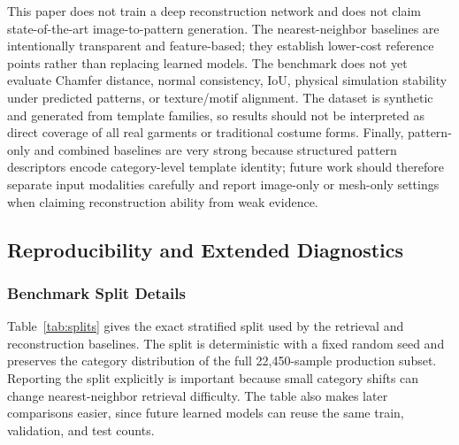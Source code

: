 \documentclass[pdflatex,sn-mathphys-num]{sn-jnl}
\begin{document}
This paper does not train a deep reconstruction network and does not claim state-of-the-art image-to-pattern generation. The nearest-neighbor baselines are intentionally transparent and feature-based; they establish lower-cost reference points rather than replacing learned models. The benchmark does not yet evaluate Chamfer distance, normal consistency, IoU, physical simulation stability under predicted patterns, or texture/motif alignment. The dataset is synthetic and generated from template families, so results should not be interpreted as direct coverage of all real garments or traditional costume forms. Finally, pattern-only and combined baselines are very strong because structured pattern descriptors encode category-level template identity; future work should therefore separate input modalities carefully and report image-only or mesh-only settings when claiming reconstruction ability from weak evidence.

\subsection{Reproducibility and Extended Diagnostics}\label{sec:reproducibility}

\subsubsection{Benchmark Split Details}\label{sec:splits}

Table~\ref{tab:splits} gives the exact stratified split used by the retrieval and reconstruction baselines. The split is deterministic with a fixed random seed and preserves the category distribution of the full 22,450-sample production subset. Reporting the split explicitly is important because small category shifts can change nearest-neighbor retrieval difficulty. The table also makes later comparisons easier, since future learned models can reuse the same train, validation, and test counts.
\end{document}
